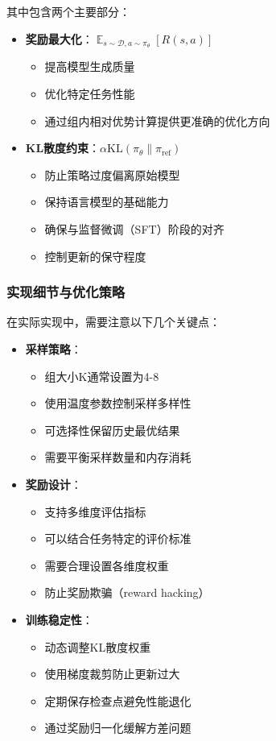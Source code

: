 \documentclass[a4paper, 12pt]{article}
\DeclareMathOperator*{\E}{\mathbb{E}}    %
\begin{document}
其中包含两个主要部分：
\begin{itemize}
    \item \textbf{奖励最大化}：$\E_{s \sim \mathcal{D}, a \sim \pi_\theta}[R(s,a)]$
        \begin{itemize}
            \item 提高模型生成质量
            \item 优化特定任务性能
            \item 通过组内相对优势计算提供更准确的优化方向
        \end{itemize}
    \item \textbf{KL散度约束}：$\alpha \text{KL}(\pi_\theta \| \pi_{\text{ref}})$
        \begin{itemize}
            \item 防止策略过度偏离原始模型
            \item 保持语言模型的基础能力
            \item 确保与监督微调（SFT）阶段的对齐
            \item 控制更新的保守程度
        \end{itemize}
\end{itemize}

\subsubsection{实现细节与优化策略}
在实际实现中，需要注意以下几个关键点：

\begin{itemize}
    \item \textbf{采样策略}：
        \begin{itemize}
            \item 组大小K通常设置为4-8
            \item 使用温度参数控制采样多样性
            \item 可选择性保留历史最优结果
            \item 需要平衡采样数量和内存消耗
        \end{itemize}
    
    \item \textbf{奖励设计}：
        \begin{itemize}
            \item 支持多维度评估指标
            \item 可以结合任务特定的评价标准
            \item 需要合理设置各维度权重
            \item 防止奖励欺骗（reward hacking）
        \end{itemize}
    
    \item \textbf{训练稳定性}：
        \begin{itemize}
            \item 动态调整KL散度权重
            \item 使用梯度裁剪防止更新过大
            \item 定期保存检查点避免性能退化
            \item 通过奖励归一化缓解方差问题
        \end{itemize}
\end{itemize}
\end{document}
